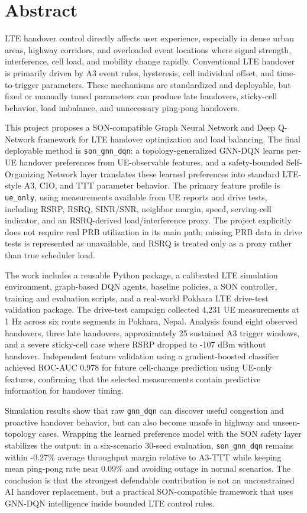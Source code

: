 \documentclass[12pt,a4paper]{report}
\newcommand{\method}{\texttt{son\_gnn\_dqn}}
\newcommand{\rawmethod}{\texttt{gnn\_dqn}}
\newcommand{\ueonly}{\texttt{ue\_only}}
\begin{document}
\chapter*{Abstract}
LTE handover control directly affects user experience, especially in dense urban areas, highway corridors, and overloaded event locations where signal strength, interference, cell load, and mobility change rapidly. Conventional LTE handover is primarily driven by A3 event rules, hysteresis, cell individual offset, and time-to-trigger parameters. These mechanisms are standardized and deployable, but fixed or manually tuned parameters can produce late handovers, sticky-cell behavior, load imbalance, and unnecessary ping-pong handovers.

This project proposes a SON-compatible Graph Neural Network and Deep Q-Network framework for LTE handover optimization and load balancing. The final deployable method is \method: a topology-generalized GNN-DQN learns per-UE handover preferences from UE-observable features, and a safety-bounded Self-Organizing Network layer translates these learned preferences into standard LTE-style A3, CIO, and TTT parameter behavior. The primary feature profile is \ueonly, using measurements available from UE reports and drive tests, including RSRP, RSRQ, SINR/SNR, neighbor margin, speed, serving-cell indicator, and an RSRQ-derived load/interference proxy. The project explicitly does not require real PRB utilization in its main path; missing PRB data in drive tests is represented as unavailable, and RSRQ is treated only as a proxy rather than true scheduler load.

The work includes a reusable Python package, a calibrated LTE simulation environment, graph-based DQN agents, baseline policies, a SON controller, training and evaluation scripts, and a real-world Pokhara LTE drive-test validation package. The drive-test campaign collected 4,231 UE measurements at 1 Hz across six route segments in Pokhara, Nepal. Analysis found eight observed handovers, three late handovers, approximately 25 sustained A3 trigger windows, and a severe sticky-cell case where RSRP dropped to -107 dBm without handover. Independent feature validation using a gradient-boosted classifier achieved ROC-AUC 0.978 for future cell-change prediction using UE-only features, confirming that the selected measurements contain predictive information for handover timing.

Simulation results show that raw \rawmethod{} can discover useful congestion and proactive handover behavior, but can also become unsafe in highway and unseen-topology cases. Wrapping the learned preference model with the SON safety layer stabilizes the output: in a six-scenario 30-seed evaluation, \method{} remains within -0.27\% average throughput margin relative to A3-TTT while keeping mean ping-pong rate near 0.09\% and avoiding outage in normal scenarios. The conclusion is that the strongest defendable contribution is not an unconstrained AI handover replacement, but a practical SON-compatible framework that uses GNN-DQN intelligence inside bounded LTE control rules.
\end{document}
